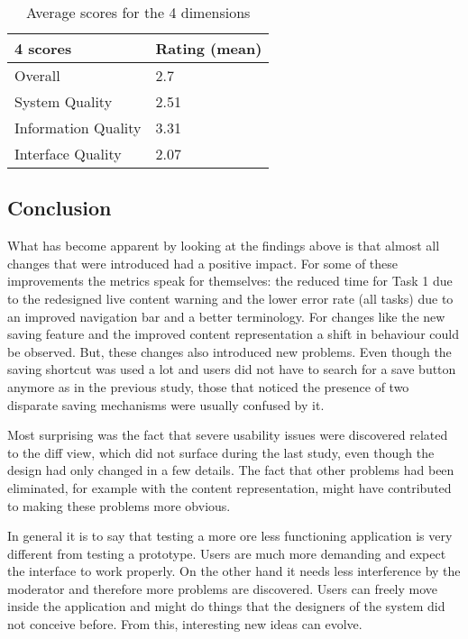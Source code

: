 \begin{table}[h!]
\centering
\begin{tabular}{|l|l|}
\hline
\rowcolor[HTML]{EFEFEF}
{\bf 4 scores} & {\bf Rating (mean)} \\ \hline
Overall & 2.7 \\ \hline
System Quality & 2.51 \\ \hline
Information Quality & 3.31 \\ \hline
Interface Quality & 2.07 \\ \hline
\end{tabular}
\caption{Average scores for the 4 dimensions}
\label{table:post-study-scores}
\end{table}

\subsection{Conclusion}
What has become apparent by looking at the findings above is that almost all changes that were introduced had a positive impact. For some of these improvements the metrics speak for themselves: the reduced time for Task 1 due to the redesigned live content warning and the lower error rate (all tasks) due to an improved navigation bar and a better terminology. For changes like the new saving feature and the improved content representation a shift in behaviour could be observed. But, these changes also introduced new problems. Even though the saving shortcut was used a lot and users did not have to search for a save button anymore as in the previous study, those that noticed the presence of two disparate saving mechanisms were usually confused by it.

Most surprising was the fact that severe usability issues were discovered related to the diff view, which did not surface during the last study, even though the design had only changed in a few details. The fact that other problems had been eliminated, for example with the content representation, might have contributed to making these problems more obvious.

In general it is to say that testing a more ore less functioning application is very different from testing a prototype. Users are much more demanding and expect the interface to work properly. On the other hand it needs less interference by the moderator and therefore more problems are discovered. Users can freely move inside the application and might do things that the designers of the system did not conceive before. From this, interesting new ideas can evolve.

